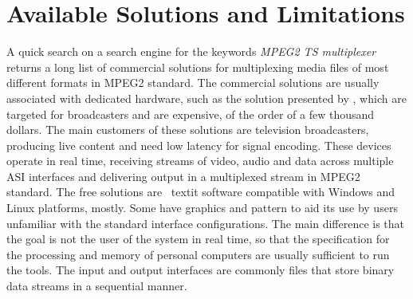 \documentclass[
	12pt,				%
	openright,			%
	twoside,			%
	a4paper,			%
	brazil,
	french,				%
	english
	]{abntex2}
\begin{document}
\chapter{Available Solutions and Limitations}

A quick search on a search engine for the keywords \textit{MPEG2 TS multiplexer} returns a long list of commercial solutions for multiplexing media files of most different formats in MPEG2 standard. The commercial solutions are usually associated with dedicated hardware, such as the solution presented by \cite{harris}, which are targeted for broadcasters and are expensive, of the order of a few thousand dollars. The main customers of these solutions are television broadcasters, producing live content and need low latency for signal encoding. These devices operate in real time, receiving streams of video, audio and data across multiple ASI interfaces and delivering output in a multiplexed stream in MPEG2 standard. The free solutions are \ textit {} software compatible with Windows and Linux platforms, mostly. Some have graphics and pattern to aid its use by users unfamiliar with the standard interface configurations. The main difference is that the goal is not the user of the system in real time, so that the specification for the processing and memory of personal computers are usually sufficient to run the tools. The input and output interfaces are commonly files that store binary data streams in a sequential manner.

\end{document}
